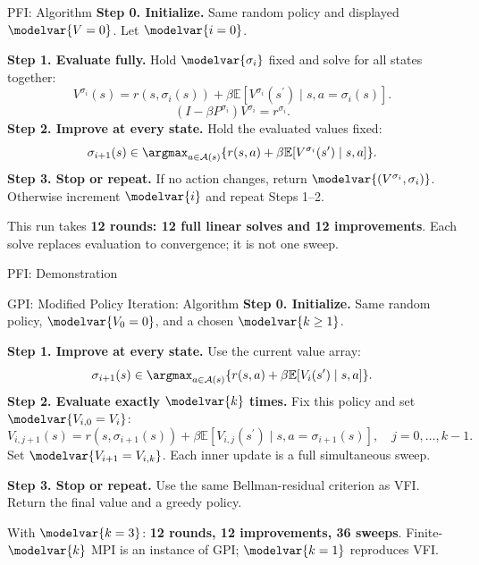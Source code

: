 \begin{frame}{PFI: Algorithm}
\small
\textbf{Step 0. Initialize.} Same random policy and displayed \(\modelvar{V=0}\). Let \(\modelvar{i=0}\).
\par\medskip
\textbf{Step 1. Evaluate fully.} Hold \(\modelvar{\sigma_i}\) fixed and solve for all states together:
\[V^{\sigma_i}(s)=r(s,\sigma_i(s))+\beta\mathbb E[V^{\sigma_i}(s^{\prime})\mid s,a=\sigma_i(s)].\]
\[(I-\beta P^{\sigma_i})V^{\sigma_i}=r^{\sigma_i}.\]
\textbf{Step 2. Improve at every state.} Hold the evaluated values fixed:
\[\sigma_{i+1}(s)\in\argmax_{a\in\mathcal A(s)}\{r(s,a)+\beta\mathbb E[V^{\sigma_i}(s^{\prime})\mid s,a]\}.\]
\textbf{Step 3. Stop or repeat.} If no action changes, return \(\modelvar{(V^{\sigma_i},\sigma_i)}\). Otherwise increment \(\modelvar{i}\) and repeat Steps 1--2.
\par\medskip This run takes \textbf{12 rounds: 12 full linear solves and 12 improvements}. Each solve replaces evaluation to convergence; it is not one sweep.
\end{frame}
\begin{frame}{PFI: Demonstration}
\centering
{}
\par{}
\end{frame}
\begin{frame}{GPI: Modified Policy Iteration: Algorithm}
\small
\textbf{Step 0. Initialize.} Same random policy, \(\modelvar{V_0=0}\), and a chosen \(\modelvar{k\geq1}\).
\par\medskip
\textbf{Step 1. Improve at every state.} Use the current value array:
\[\sigma_{i+1}(s)\in\argmax_{a\in\mathcal A(s)}\{r(s,a)+\beta\mathbb E[V_i(s^{\prime})\mid s,a]\}.\]
\textbf{Step 2. Evaluate exactly \(\modelvar{k}\) times.} Fix this policy and set \(\modelvar{V_{i,0}=V_i}\):
\[V_{i,j+1}(s)=r(s,\sigma_{i+1}(s))+\beta\mathbb E[V_{i,j}(s^{\prime})\mid s,a=\sigma_{i+1}(s)],
\quad j=0,\ldots,k-1.\]
Set \(\modelvar{V_{i+1}=V_{i,k}}\). Each inner update is a full simultaneous sweep.
\par\medskip
\textbf{Step 3. Stop or repeat.} Use the same Bellman-residual criterion as VFI. Return the final value and a greedy policy.
\par\medskip With \(\modelvar{k=3}\): \textbf{12 rounds, 12 improvements, 36 sweeps}. Finite-\(\modelvar{k}\) MPI is an instance of GPI; \(\modelvar{k=1}\) reproduces VFI.
\end{frame}
